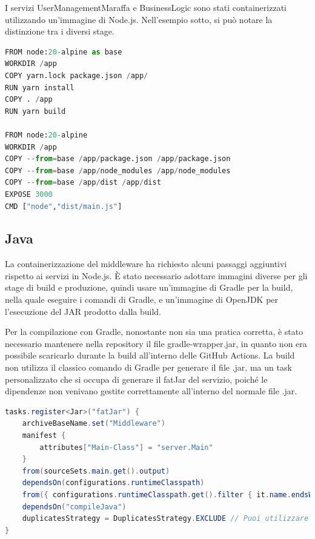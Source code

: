 I servizi UserManagementMaraffa e BusinessLogic sono stati containerizzati utilizzando un'immagine di Node.js. Nell'esempio sotto, si può notare la distinzione tra i diversi stage.
\vspace{1cm}

\begin{lstlisting}[language=Python, caption={Dockerfile delle immagini NodeJS}, label=list:dockerfile_nodejs]
FROM node:20-alpine as base
WORKDIR /app
COPY yarn.lock package.json /app/
RUN yarn install
COPY . /app
RUN yarn build

FROM node:20-alpine
WORKDIR /app    
COPY --from=base /app/package.json /app/package.json
COPY --from=base /app/node_modules /app/node_modules
COPY --from=base /app/dist /app/dist
EXPOSE 3000
CMD ["node","dist/main.js"]
\end{lstlisting}

\subsection{Java}

La containerizzazione del middleware ha richiesto alcuni passaggi aggiuntivi rispetto ai servizi in Node.js.
È stato necessario adottare immagini diverse per gli stage di build e produzione, quindi usare un'immagine di Gradle per la build, nella quale eseguire i comandi di Gradle, e un'immagine di 
OpenJDK per l'esecuzione del JAR prodotto dalla build.

Per la compilazione con Gradle, nonostante non sia una pratica corretta, è stato necessario mantenere nella repository il file gradle-wrapper.jar, in quanto non era possibile scaricarlo durante la build all'interno delle GitHub Actions.
La build non utilizza il classico comando di Gradle per generare il file .jar, ma un task personalizzato che si occupa di generare il fatJar del servizio, poiché le dipendenze non venivano gestite correttamente all'interno del normale file .jar.

\begin{lstlisting}[language=Java, caption={Task del fatJar da includere nel container}, label=list:gradle_fatJar]
tasks.register<Jar>("fatJar") {
    archiveBaseName.set("Middleware")
    manifest {
        attributes["Main-Class"] = "server.Main"
    }
    from(sourceSets.main.get().output)
    dependsOn(configurations.runtimeClasspath)
    from({ configurations.runtimeClasspath.get().filter { it.name.endsWith("jar") }.map { zipTree(it) } })
    dependsOn("compileJava")
    duplicatesStrategy = DuplicatesStrategy.EXCLUDE // Puoi utilizzare altre strategie come DuplicatesStrategy.WARN per avvisare ma non fermare la build
}
\end{lstlisting}


